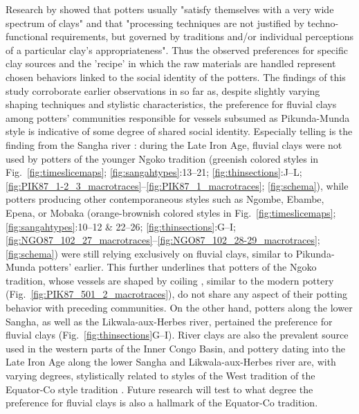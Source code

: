\documentclass[smallextended,natbib]{svjour3}       %
\begin{document}
Research by \citet[148]{Gosselain.1997} showed that potters usually "satisfy themselves with a very wide spectrum of clays" and that "processing techniques are not justified by techno-functional requirements, but governed by traditions and/or individual perceptions of a particular clay's appropriateness". Thus the observed preferences for specific clay sources and the 'recipe' in which the raw materials are handled represent chosen behaviors linked to the social identity of the potters. The findings of this study corroborate earlier observations \citep[123--124]{Seidensticker.2016b} in so far as, despite slightly varying shaping techniques and stylistic characteristics, the preference for fluvial clays among potters' communities responsible for vessels subsumed as Pikunda-Munda style is indicative of some degree of shared social identity. Especially telling is the finding from the Sangha river \citep{Seidensticker.2020}: during the Late Iron Age, fluvial clays were not used by potters of the younger Ngoko tradition (greenish colored styles in Fig.~\ref{fig:timeslicemaps}; \ref{fig:sangahtypes}:13--21; \ref{fig:thinsections}:J--L; \ref{fig:PIK87_1-2_3_macrotraces}--\ref{fig:PIK87_1_macrotraces}; \ref{fig:schema}), while potters producing other contemporaneous styles such as Ngombe, Ebambe, Epena, or Mobaka (orange-brownish colored styles in Fig.~\ref{fig:timeslicemaps}; \ref{fig:sangahtypes}:10--12 \& 22--26; \ref{fig:thinsections}:G--I; \ref{fig:NGO87_102_27_macrotraces}--\ref{fig:NGO87_102_28-29_macrotraces}; \ref{fig:schema}) were still relying exclusively on fluvial clays, similar to Pikunda-Munda potters' earlier. This further underlines that potters of the Ngoko tradition, whose vessels are shaped by coiling \citep[Fig.~\ref{fig:PIK87_1-2_3_macrotraces}--\ref{fig:PIK87_1_macrotraces};][53--54 Fig.~16B, 72 Tab.~13]{Seidensticker.2021e}, similar to the modern pottery (Fig.~\ref{fig:PIK87_501_2_macrotraces}), do not share any aspect of their potting behavior with preceding communities. On the other hand, potters along the lower Sangha, as well as the Likwala-aux-Herbes river, pertained the preference for fluvial clays (Fig.~\ref{fig:thinsections}G--I). River clays are also the prevalent source used in the western parts of the Inner Congo Basin, and pottery dating into the Late Iron Age along the lower Sangha and Likwala-aux-Herbes river are, with varying degrees, stylistically related to styles of the West tradition of the Equator-Co style tradition \citep[221--222 Fig.~4]{Wotzka.1995}. Future research will test to what degree the preference for fluvial clays is also a hallmark of the Equator-Co tradition.
\end{document}
